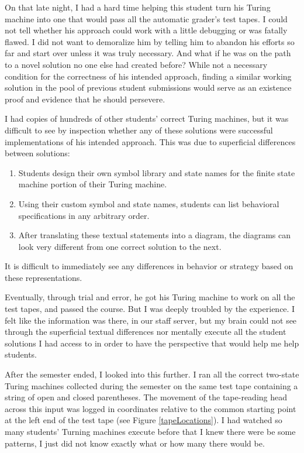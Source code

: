On that late night, I had a hard time helping this student turn his Turing machine into one that would pass all the automatic grader's test tapes. I could not tell whether his approach could work with a little debugging or was fatally flawed. I did not want to demoralize him by telling him to abandon his efforts so far and start over unless it was truly necessary. And what if he was on the path to a novel solution no one else had created before? While not a necessary condition for the correctness of his intended approach, finding a similar working solution in the pool of previous student submissions would serve as an existence proof and evidence that he should persevere. 

I had copies of hundreds of other students' correct Turing machines, but it was difficult to see by inspection whether any of these solutions were successful implementations of his intended approach. This was due to superficial differences between solutions: 
\begin{enumerate}
\item Students design their own symbol library and state names for the finite state machine portion of their Turing machine. 
\item Using their custom symbol and state names, students can list behavioral specifications in any arbitrary order. 
\item After translating these textual statements into a diagram, the diagrams can look very different from one correct solution to the next. 
\end{enumerate}
It is difficult to immediately see any differences in behavior or strategy based on these representations.

Eventually, through trial and error, he got his Turing machine to work on all the test tapes, and passed the course. But I was deeply troubled by the experience. I felt like the information was there, in our staff server, but my brain could not see through the superficial textual differences nor mentally execute all the student solutions I had access to in order to have the perspective that would help me help students.

After the semester ended, I looked into this further. I ran all the correct two-state Turing machines collected during the semester on the same test tape containing a string of open and closed parentheses. The movement of the tape-reading head across this input was logged in coordinates relative to the common starting point at the left end of the test tape (see Figure \ref{tapeLocations}). I had watched so many students' Turning machines execute before that I knew there were be some patterns, I just did not know exactly what or how many there would be.

